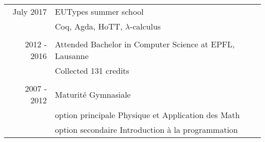 \documentclass[a4paper,10pt]{article} %
\begin{document}
\begin{tabular}{rl}	

July 2017 & EUTypes summer school \\&\footnotesize{Coq, Agda, HoTT, $\lambda$-calculus} \\
\multicolumn{2}{c}{}\\
2012 - 2016 & Attended Bachelor in Computer Science at EPFL, Lausanne\\
& \footnotesize{Collected 131 credits}\\
\multicolumn{2}{c}{}\\


2007 - 2012 & Maturité Gymnasiale\\ & option principale Physique et Application des Math\\ & option secondaire Introduction à la programmation\\
\end{tabular}

\end{document}
